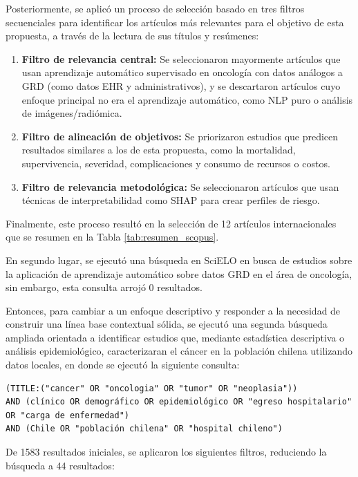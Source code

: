 Posteriormente, se aplicó un proceso de selección basado en tres filtros secuenciales para identificar los artículos más relevantes para el objetivo de esta propuesta, a través de la lectura de sus títulos y resúmenes:

\begin{enumerate}
    \item \textbf{Filtro de relevancia central:} Se seleccionaron mayormente artículos que usan aprendizaje automático supervisado en oncología con datos análogos a GRD (como datos EHR y administrativos), y se descartaron artículos cuyo enfoque principal no era el aprendizaje automático, como NLP puro o análisis de imágenes/radiómica.

    \item \textbf{Filtro de alineación de objetivos:} Se priorizaron estudios que predicen resultados similares a los de esta propuesta, como la mortalidad, supervivencia, severidad, complicaciones y consumo de recursos o costos.
    
    \item \textbf{Filtro de relevancia metodológica:} Se seleccionaron artículos que usan técnicas de interpretabilidad como SHAP para crear perfiles de riesgo.
\end{enumerate}

Finalmente, este proceso resultó en la selección de 12 artículos internacionales que se resumen en la Tabla \ref{tab:resumen_scopus}.

En segundo lugar, se ejecutó una búsqueda en SciELO en busca de estudios sobre la aplicación de aprendizaje automático sobre datos GRD en el área de oncología, sin embargo, esta consulta arrojó 0 resultados. 

Entonces, para cambiar a un enfoque descriptivo y responder a la necesidad de construir una línea base contextual sólida, se ejecutó una segunda búsqueda ampliada orientada a identificar estudios que, mediante estadística descriptiva o análisis epidemiológico, caracterizaran el cáncer en la población chilena utilizando datos locales, en donde se ejecutó la siguiente consulta:

\begin{lstlisting}[style=query]
(TITLE:("cancer" OR "oncologia" OR "tumor" OR "neoplasia")) 
AND (clínico OR demográfico OR epidemiológico OR "egreso hospitalario" OR "carga de enfermedad") 
AND (Chile OR "población chilena" OR "hospital chileno")
\end{lstlisting}

De 1583 resultados iniciales, se aplicaron los siguientes filtros, reduciendo la búsqueda a 44 resultados:

